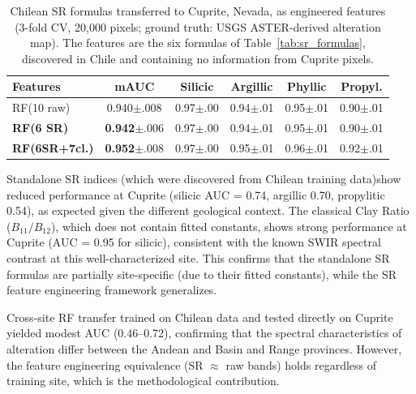 \documentclass[preprint,authoryear,number]{elsarticle}
\begin{document}
\begin{table}[ht]
\centering
\caption{Chilean SR formulas transferred to Cuprite, Nevada, as engineered features (3-fold CV, 20{,}000 pixels; ground truth: USGS ASTER-derived alteration map). The features are the six formulas of Table~\ref{tab:sr_formulas}, discovered in Chile and containing no information from Cuprite pixels.}
\label{tab:cuprite}
\begin{tabular}{lccccc}
\toprule
Features & mAUC & Silicic & Argillic & Phyllic & Propyl. \\
\midrule
RF(10 raw) & 0.940{\tiny$\pm$.008} & 0.97{\tiny$\pm$.00} & 0.94{\tiny$\pm$.01} & 0.95{\tiny$\pm$.01} & 0.90{\tiny$\pm$.01} \\
\textbf{RF(6 SR)} & \textbf{0.942}{\tiny$\pm$.006} & 0.97{\tiny$\pm$.00} & 0.94{\tiny$\pm$.01} & 0.95{\tiny$\pm$.01} & 0.90{\tiny$\pm$.01} \\
\textbf{RF(6SR+7cl.)} & \textbf{0.952}{\tiny$\pm$.008} & 0.97{\tiny$\pm$.00} & 0.95{\tiny$\pm$.01} & 0.96{\tiny$\pm$.01} & 0.92{\tiny$\pm$.01} \\
\bottomrule
\end{tabular}
\end{table}

Standalone SR indices (which were discovered from Chilean training data)show reduced performance at Cuprite (silicic AUC = 0.74, argillic 0.70, propylitic 0.54), as expected given the different geological context. The classical Clay Ratio ($B_{11}/B_{12}$), which does not contain fitted constants, shows strong performance at Cuprite (AUC = 0.95 for silicic), consistent with the known SWIR spectral contrast at this well-characterized site. This confirms that the standalone SR formulas are partially site-specific (due to their fitted constants), while the SR feature engineering framework generalizes.

Cross-site RF transfer trained on Chilean data and tested directly on Cuprite yielded modest AUC (0.46--0.72), confirming that the spectral characteristics of alteration differ between the Andean and Basin and Range provinces. However, the feature engineering equivalence (SR $\approx$ raw bands) holds regardless of training site, which is the methodological contribution.
\end{document}
